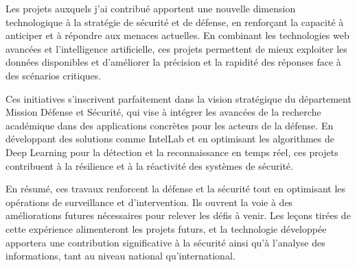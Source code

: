 %
\sloppy

Les projets auxquels j'ai contribué apportent une nouvelle dimension technologique à la stratégie de sécurité et de défense, en renforçant la capacité à anticiper et à répondre aux menaces actuelles. En combinant les technologies web avancées et l'intelligence artificielle, ces projets permettent de mieux exploiter les données disponibles et d'améliorer la précision et la rapidité des réponses face à des scénarios critiques.

Ces initiatives s'inscrivent parfaitement dans la vision stratégique du département Mission Défense et Sécurité, qui vise à intégrer les avancées de la recherche académique dans des applications concrètes pour les acteurs de la défense. En développant des solutions comme IntelLab et en optimisant les algorithmes de Deep Learning pour la détection et la reconnaissance en temps réel, ces projets contribuent à la résilience et à la réactivité des systèmes de sécurité.

En résumé, ces travaux renforcent la défense et la sécurité tout en optimisant les opérations de surveillance et d'intervention.
Ils ouvrent la voie à des améliorations futures nécessaires pour relever les défis à venir. 
Les leçons tirées de cette expérience alimenteront les projets futurs, et la technologie développée apportera une contribution significative à la sécurité ainsi qu'à l'analyse des informations, tant au niveau national qu'international.
